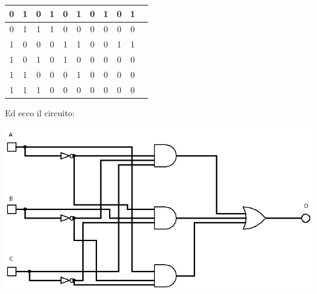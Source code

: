 \documentclass[a4paper,12pt, oneside]{book}
\begin{document}
\begin{esercizio}
\begin{center}
\begin{tabular}{|c|c|c|c|c|c|c|c|c|c|c|}
\hline
0 & 1 & 0 & 1 & 0 & 1 & 0 & 1 & 0 &  1\\
\hline
0 & 1 & 1 & 1 & 0 & 0 & 0 & 0 & 0 &  0\\
\hline
1 & 0 & 0 & 0 & 1 & 1 & 0 & 0 & 1 &  1\\
\hline
1 & 0 & 1 & 0 & 1 & 0 & 0 & 0 & 0 &  0\\
\hline
1 & 1 & 0 & 0 & 0 & 1 & 0 & 0 & 0 &  0\\
\hline
1 & 1 & 1 & 0 & 0 & 0 & 0 & 0 & 0 &  0\\
\hline
\end{tabular}
\end{center}
\newpage
Ed ecco il circuito:
\begin{center}
\includegraphics[scale=0.65]{img/es4.png}
\end{center}
\end{esercizio}
\end{document}
